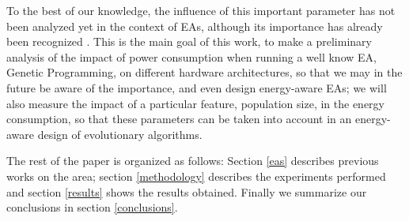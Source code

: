 To the best of our knowledge, the influence of this important
parameter has not been analyzed yet in the context of EAs, although
its importance has already been recognized \cite{self}.  This is
the main goal of this work, to make a preliminary analysis of the
impact of power consumption when running a well know EA, Genetic
Programming, on different hardware architectures, so that we may in
the future be aware of the 
importance, and even design energy-aware EAs; we will also measure the
impact of a particular feature, population size, in the energy
consumption, so that these parameters can be taken into account in an
energy-aware design of evolutionary algorithms. 

The rest of the paper is organized as follows:  Section \ref{eas}
describes previous works on the area;  section \ref{methodology}
describes the experiments performed and section \ref{results} shows
the results obtained.  Finally we summarize our conclusions in section
\ref{conclusions}. 


